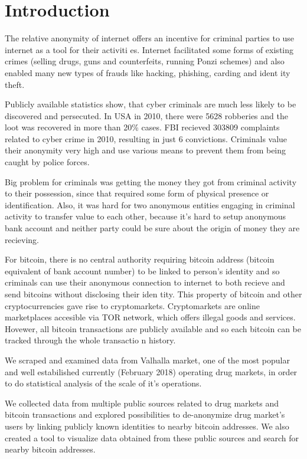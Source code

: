 \documentclass[
  digital, %
  table,   %
  lof,     %
  lot,     %
  oneside
]{fithesis3}
\begin{document}
\chapter{Introduction}

The relative anonymity of internet offers an incentive for criminal parties to use internet as a tool for their activiti
es.
Internet facilitated some forms of existing crimes (selling drugs, guns and
counterfeits, running Ponzi schemes) and also enabled many new types of frauds like hacking, phishing, carding and ident
ity theft.

Publicly available statistics show, that cyber criminals are much
 less likely to be discovered and persecuted.
 In USA in 2010, there were 5628 robberies and the loot was recovered in more than 20\% cases. \parencite{fbi10} 
 FBI recieved 303809 complaints related to cyber crime in 2010, resulting in just 6 convictions. \parencite{fbcyber} 
Criminals value their anonymity very high and use various means to prevent them from being caught by police forces.

Big problem for criminals was getting the money they got from criminal activity to their possession,
since that required some form of physical presence or identification.
Also, it was hard for two anonymous entities engaging in criminal activity to transfer value to each other,
 because it's hard to setup anonymous bank account and neither party could be sure about the origin of
 money they are recieving.

For bitcoin, there is no central authority requiring bitcoin address
(bitcoin equivalent of bank account number) to be linked to person's identity and so 
criminals can use their anonymous connection to internet to both recieve and send bitcoins without disclosing their iden
tity.
This property of bitcoin and other cryptocurrencies gave rise to cryptomarkets.
 Cryptomarkets are online marketplaces accesible via TOR network, which offers illegal goods and services.
Hovewer, all bitcoin transactions are publicly available and so each bitcoin can be tracked through the whole transactio
n history.

We scraped and examined data from Valhalla market,
 one of the most popular and well estabilished currently (February 2018) operating drug markets,
in order to do statistical analysis of the scale of it's operations.

We collected data from multiple public sources related to drug markets and bitcoin transactions and explored
 possibilities to de-anonymize drug market's users by linking publicly known identities to nearby bitcoin addresses.
We also created a tool to visualize data obtained from these public sources and search for nearby bitcoin addresses.
\end{document}
